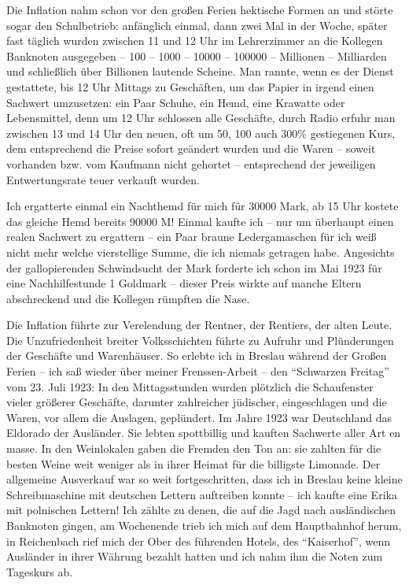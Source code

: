 Die Inflation nahm schon vor den großen Ferien hektische Formen an und störte sogar den Schulbetrieb: anfänglich einmal, dann zwei Mal in der Woche, später fast täglich wurden zwischen 11 und 12 Uhr im Lehrerzimmer an die Kollegen Banknoten ausgegeben -- \num{100} -- \num{1000} -- \num{10000} -- \num{100000} -- Millionen -- Milliarden und schließlich über Billionen lautende Scheine. Man rannte, wenn es der Dienst gestattete, bis 12 Uhr Mittags zu Geschäften, um das Papier in irgend einen Sachwert umzusetzen: ein Paar Schuhe, ein Hemd, eine Krawatte oder Lebensmittel, denn um 12 Uhr schlossen alle Geschäfte, durch Radio erfuhr man zwischen 13 und 14 Uhr den neuen, oft um 50, 100 auch 300\% gestiegenen Kurs, dem entsprechend die Preise sofort geändert wurden und die Waren -- soweit vorhanden bzw. vom Kaufmann nicht gehortet -- entsprechend der jeweiligen Entwertungsrate teuer verkauft wurden.

Ich ergatterte einmal ein Nachthemd für mich für \num{30000} Mark, ab 15 Uhr kostete das gleiche Hemd bereits \num{90000} M! Einmal kaufte ich -- nur um überhaupt einen realen Sachwert zu ergattern -- ein Paar braune Ledergamaschen für ich weiß nicht mehr welche vierstellige Summe, die ich niemals getragen habe. Angesichts der gallopierenden Schwindsucht der Mark forderte ich schon im Mai 1923 für eine Nachhilfestunde 1 Goldmark -- dieser Preis wirkte auf manche Eltern abschreckend und die Kollegen rümpften die Nase.

Die Inflation führte zur Verelendung der Rentner, der Rentiers, der alten Leute. Die Unzufriedenheit breiter Volksschichten führte zu Aufruhr und Plünderungen der Geschäfte und Warenhäuser. So erlebte ich in Breslau während der Großen Ferien -- ich saß wieder über meiner Frenssen-Arbeit -- den \enquote{Schwarzen Freitag} vom 23. Juli 1923: In den Mittagsstunden wurden plötzlich die Schaufenster vieler größerer Geschäfte, darunter zahlreicher jüdischer, eingeschlagen und die Waren, vor allem die Auslagen, geplündert. Im Jahre 1923 war Deutschland das Eldorado der Ausländer. Sie lebten spottbillig und kauften Sachwerte aller Art en masse. In den Weinlokalen gaben die Fremden den Ton an: sie zahlten für die besten Weine weit weniger als in ihrer Heimat für die billigste Limonade. Der allgemeine Ausverkauf war so weit fortgeschritten, dass ich in Breslau keine kleine Schreibmaschine mit deutschen Lettern auftreiben konnte -- ich kaufte eine Erika mit polnischen Lettern! Ich zählte zu denen, die auf die Jagd nach ausländischen Banknoten gingen, am Wochenende trieb ich mich auf dem Hauptbahnhof herum, in Reichenbach rief mich der Ober des führenden Hotels, des \enquote{Kaiserhof}, wenn Ausländer in ihrer Währung bezahlt hatten und ich nahm ihm die Noten zum Tageskurs ab.

